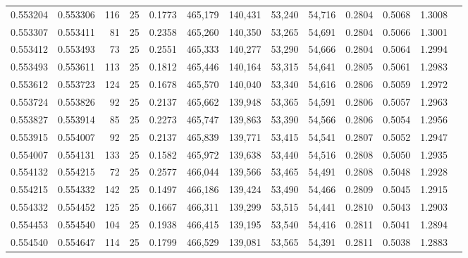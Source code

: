 \begin{tabular}{rrrrrrrrrrrrr}
0.553204 & 0.553306 &   116 &  25 &                                     0.1773 & 465,179 & 140,431 &  53,240 &  54,716 & 0.2804 & 0.5068 & 1.3008 \\
0.553307 & 0.553411 &    81 &  25 &                                     0.2358 & 465,260 & 140,350 &  53,265 &  54,691 & 0.2804 & 0.5066 & 1.3001 \\
0.553412 & 0.553493 &    73 &  25 &                                     0.2551 & 465,333 & 140,277 &  53,290 &  54,666 & 0.2804 & 0.5064 & 1.2994 \\
0.553493 & 0.553611 &   113 &  25 &                                     0.1812 & 465,446 & 140,164 &  53,315 &  54,641 & 0.2805 & 0.5061 & 1.2983 \\
0.553612 & 0.553723 &   124 &  25 &                                     0.1678 & 465,570 & 140,040 &  53,340 &  54,616 & 0.2806 & 0.5059 & 1.2972 \\
0.553724 & 0.553826 &    92 &  25 &                                     0.2137 & 465,662 & 139,948 &  53,365 &  54,591 & 0.2806 & 0.5057 & 1.2963 \\
0.553827 & 0.553914 &    85 &  25 &                                     0.2273 & 465,747 & 139,863 &  53,390 &  54,566 & 0.2806 & 0.5054 & 1.2956 \\
0.553915 & 0.554007 &    92 &  25 &                                     0.2137 & 465,839 & 139,771 &  53,415 &  54,541 & 0.2807 & 0.5052 & 1.2947 \\
0.554007 & 0.554131 &   133 &  25 &                                     0.1582 & 465,972 & 139,638 &  53,440 &  54,516 & 0.2808 & 0.5050 & 1.2935 \\
0.554132 & 0.554215 &    72 &  25 &                                     0.2577 & 466,044 & 139,566 &  53,465 &  54,491 & 0.2808 & 0.5048 & 1.2928 \\
0.554215 & 0.554332 &   142 &  25 &                                     0.1497 & 466,186 & 139,424 &  53,490 &  54,466 & 0.2809 & 0.5045 & 1.2915 \\
0.554332 & 0.554452 &   125 &  25 &                                     0.1667 & 466,311 & 139,299 &  53,515 &  54,441 & 0.2810 & 0.5043 & 1.2903 \\
0.554453 & 0.554540 &   104 &  25 &                                     0.1938 & 466,415 & 139,195 &  53,540 &  54,416 & 0.2811 & 0.5041 & 1.2894 \\
0.554540 & 0.554647 &   114 &  25 &                                     0.1799 & 466,529 & 139,081 &  53,565 &  54,391 & 0.2811 & 0.5038 & 1.2883 \\

\end{tabular}
